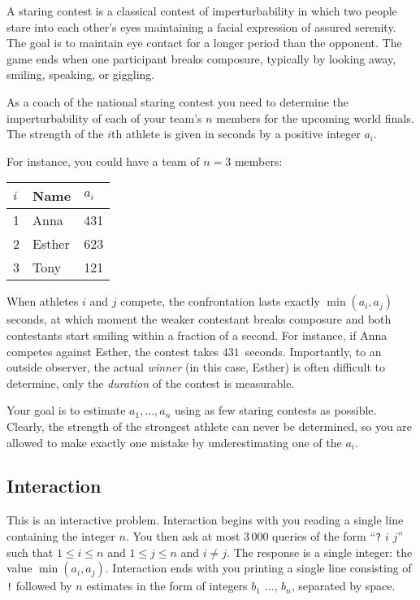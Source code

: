 
A staring contest is a classical contest of imperturbability in which two people stare into each other's eyes maintaining a facial expression of assured serenity.
The goal is to maintain eye contact for a longer period than the opponent.
The game ends when one participant breaks composure, typically by looking away, smiling, speaking, or giggling.

As a coach of the national staring contest you need to determine the imperturbability of each of your team's $n$ members for the upcoming world finals.
The strength of the $i$th athlete is given in seconds by a positive integer $a_i$.

For instance, you could have a team of $n=3$ members:

\medskip
\begin{tabular}{lll}
  $i$ & Name & $a_i$\\\hline
  1 & Anna &  431 \\
  2 & Esther & 623 \\
  3 & Tony &  121\\
\end{tabular}

\medskip
When athletes $i$ and $j$ compete, the confrontation lasts exactly $\min(a_i, a_j)$ seconds, at which moment the weaker contestant breaks composure and both contestants start smiling within a fraction of a second.
For instance, if Anna competes against Esther, the contest takes $431$~seconds.
Importantly, to an outside observer, the actual \emph{winner} (in this case, Esther) is often difficult to determine, only the \emph{duration} of the contest is measurable.

Your goal is to estimate $a_1,\ldots, a_n$ using as few staring contests as possible.
Clearly, the strength of the strongest athlete can never be determined, so you are allowed to make exactly one mistake by underestimating one of the $a_i$.

\subsection*{Interaction}

This is an interactive problem.
Interaction begins with you reading a single line containing the integer $n$.
You then ask at most $3\,000$ queries of the form ``\texttt{?} $i$ $j$'' such that $1\leq i\leq n$ and $1\leq j\leq n$ and $i\neq j$.
The response is a single integer: the value $\min(a_i, a_j)$.
Interaction ends with you printing a single line consisting of \texttt{!} followed by $n$ estimates in the form of integers $b_1$ $\ldots$, $b_n$, separated by space.

